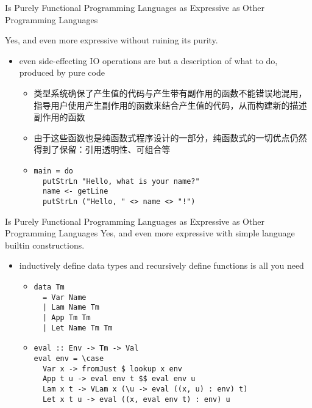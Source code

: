 \documentclass{beamer}
\begin{document}
\begin{frame}[fragile]{Is Purely Functional Programming Languages as Expressive as Other Programming Languages}

Yes, and even more expressive without ruining its purity.

\begin{itemize}
\item even side-effecting IO operations are but a description of what to do, produced by pure code
\begin{itemize}
    \pause\item 类型系统确保了产生值的代码与产生带有副作用的函数不能错误地混用，指导用户使用产生副作用的函数来结合产生值的代码，从而构建新的描述副作用的函数
    \pause\item 由于这些函数也是纯函数式程序设计的一部分，纯函数式的一切优点仍然得到了保留：引用透明性、可组合等
    \pause\item \begin{verbatim}
main = do
  putStrLn "Hello, what is your name?"
  name <- getLine
  putStrLn ("Hello, " <> name <> "!")
    \end{verbatim}
\end{itemize}
\end{itemize}

\end{frame}

\begin{frame}[fragile]{Is Purely Functional Programming Languages as Expressive as Other Programming Languages}
Yes, and even more expressive with simple language builtin constructions.
    \begin{itemize}
        \item inductively define data types and recursively define functions is all you need
\begin{itemize}
\pause\item\begin{verbatim}
data Tm
  = Var Name
  | Lam Name Tm
  | App Tm Tm
  | Let Name Tm Tm
\end{verbatim}
\pause\item\begin{verbatim}
eval :: Env -> Tm -> Val
eval env = \case
  Var x -> fromJust $ lookup x env
  App t u -> eval env t $$ eval env u
  Lam x t -> VLam x (\u -> eval ((x, u) : env) t)
  Let x t u -> eval ((x, eval env t) : env) u
\end{verbatim}
\end{itemize}
    \end{itemize}
\end{frame}
\end{document}
